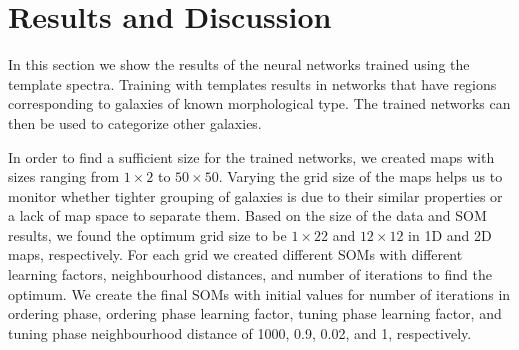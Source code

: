 \section{Results and Discussion}
\label{sec: result}

    In this section we show the results of the neural networks trained using the  template spectra.
    Training with  templates results in networks that have regions corresponding to galaxies of known morphological type. 
    The trained networks can then be used to categorize other galaxies.

    In order to find a sufficient size for the trained networks, we created maps with sizes ranging from $1\times2$ to $50\times50$.
    Varying the grid size of the maps helps us to monitor whether tighter grouping of galaxies is due to their similar properties or a lack of map space to separate them.
   Based on the size of the data and SOM results, we found the optimum grid size to be $1\times22$ and $12\times12$ in 1D and 2D maps, respectively. 
    For each grid we created different SOMs with different learning factors, neighbourhood distances, and number of iterations to find the optimum.
    We create the final SOMs with initial values for number of iterations in ordering phase, ordering phase learning factor, tuning phase learning factor, and tuning phase neighbourhood distance of 1000, 0.9, 0.02, and 1, respectively.
   
